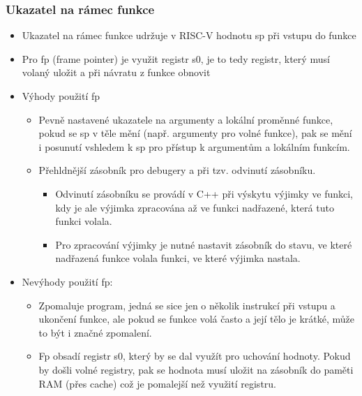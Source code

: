 \documentclass{beamer}
\begin{document}
\begin{frame}[shrink=5]
\frametitle{Ukazatel na rámec funkce}

\begin{itemize}
 \item Ukazatel na rámec funkce udržuje v RISC-V hodnotu sp při vstupu do funkce
 \item Pro fp (frame pointer) je využit registr s0, je to tedy registr, který musí volaný uložit a při návratu z funkce obnovit
 \item Výhody použití fp
\begin{itemize}
 \item Pevně nastavené ukazatele na argumenty a lokální proměnné funkce, pokud se sp v těle mění (např. argumenty pro volné funkce), pak se mění i posunutí vshledem k sp pro přístup k argumentům a lokálním funkcím.
 \item Přehldnější zásobník pro debugery a při tzv. odvinutí zásobníku.
\begin{itemize}
 \item Odvinutí zásobníku se provádí v C++ při výskytu výjimky ve funkci, kdy je ale výjimka zpracována až ve funkci nadřazené, která tuto funkci volala.
 \item Pro zpracování výjimky je nutné nastavit zásobník do stavu, ve které nadřazená funkce volala funkci, ve které výjimka nastala.
\end{itemize}
\end{itemize}
 \item Nevýhody použití fp:
\begin{itemize}
 \item Zpomaluje program, jedná se sice jen o několik instrukcí při vstupu a ukončení funkce, ale pokud se funkce volá často a její tělo je krátké, může to být i značné zpomalení.
 \item Fp obsadí registr s0, který by se dal využít pro uchování hodnoty. Pokud by došli volné registry, pak se hodnota musí uložit na zásobník do paměti RAM (přes cache) což je pomalejší než využití registru.
\end{itemize}
\end{itemize}
\end{frame}
\end{document}

